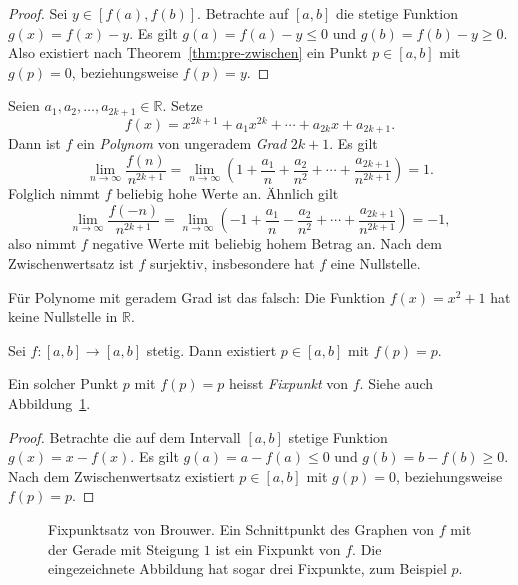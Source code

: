 \documentclass[../main.tex]{subfiles}
\begin{document}
\begin{proof}
  Sei $y \in [f(a), f(b)]$. Betrachte
  auf $[a, b]$ die stetige Funktion
  $g(x) = f(x) - y$.
  Es gilt $g(a) = f(a) - y \leq 0$ und
  $g(b) = f(b) - y \geq 0$.
  Also existiert nach Theorem~\ref{thm:pre-zwischen}
  ein Punkt $p \in [a, b]$ mit $g(p) = 0$,
  beziehungsweise $f(p) = y$.
\end{proof}

\begin{example}
  Seien $a_1, a_2, \dots, a_{2k + 1} \in \mathbb{R}$.
  Setze
  \[
  f(x) = x^{2k+1} + a_1 x^{2k}
  + \cdots + a_{2k}x + a_{2k+1}.
  \]
  Dann ist $f$ ein \emph{Polynom} von ungeradem
  \emph{Grad} $2k + 1$. Es gilt
  \[
    \lim_{n \to \infty} \frac{f(n)}{n^{2k+1}}
    = \lim_{n \to \infty}
    \left( 1 + \frac{a_1}{n} + \frac{a_2}{n^2}
    + \cdots + \frac{a_{2k+1}}{n^{2k+1}}\right) = 1.
  \]
  Folglich nimmt $f$ beliebig hohe Werte an.
  Ähnlich gilt
  \[
    \lim_{n \to \infty} \frac{f(-n)}{n^{2k+1}}
    = \lim_{n \to \infty}
    \left( -1 + \frac{a_1}{n} - \frac{a_2}{n^2}
    + \cdots + \frac{a_{2k+1}}{n^{2k+1}}\right) = -1,
  \]
  also nimmt $f$ negative Werte
  mit beliebig hohem Betrag an.
  Nach dem Zwischenwertsatz 
  ist $f$ surjektiv, insbesondere hat $f$ eine Nullstelle.
\end{example}

\begin{remark}
  Für Polynome mit geradem Grad ist das falsch:
  Die Funktion $f(x) = x^2 + 1$ hat keine Nullstelle
  in $\mathbb{R}$.
\end{remark}

\begin{brouwer}
  Sei $f \colon [a, b] \to [a, b]$ stetig.
  Dann existiert $p \in [a, b]$ mit $f(p) = p$.
\end{brouwer}

Ein solcher Punkt $p$ mit $f(p) = p$ heisst \emph{Fixpunkt}
von $f$. Siehe auch Abbildung~\ref{fig:brouwer}.

\begin{proof}
  Betrachte die auf dem Intervall
  $[a, b]$ stetige Funktion
  $g(x) = x - f(x)$.
  Es gilt
  $
    g(a) = a - f(a) \leq 0$
    und
    $g(b) = b - f(b) \geq 0$.
  Nach dem Zwischenwertsatz existiert
  $p \in [a,b]$ mit $g(p) = 0$,
  beziehungsweise $f(p) = p$.
\end{proof}

\begin{figure}[htb]
  \centering
  
  \caption{Fixpunktsatz von Brouwer.
  Ein Schnittpunkt des Graphen von $f$ mit
der Gerade mit Steigung $1$ ist ein
Fixpunkt von $f$. Die eingezeichnete Abbildung
hat sogar drei Fixpunkte, zum Beispiel $p$.}%
  \label{fig:brouwer}
\end{figure}
\end{document}
